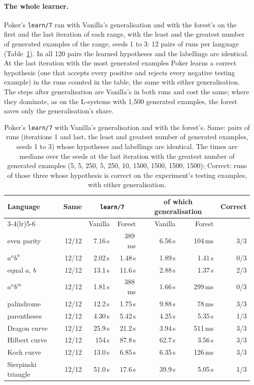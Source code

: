 \documentclass[11pt]{article}
\begin{document}
\paragraph{The whole learner.} Poker's \nolinkurl{learn/7} ran with Vanilla's
generalisation and with the forest's on the first and the last iteration of each
range, with the least and the greatest number of generated examples of the range,
seeds 1 to 3: 12 pairs of runs per language (Table~\ref{tab:aaai-learn}).
In all 120 pairs the learned hypotheses and the labellings are identical. At the
last iteration with the most generated examples Poker learns a correct hypothesis
(one that accepts every positive and rejects every negative testing example) in the
runs counted in the table, the same with either generalisation. The steps after
generalisation are Vanilla's in both runs and cost the same; where they dominate,
as on the L-systems with 1,500 generated examples, the forest saves only the
generalisation's share.

\begin{table}[ht]
\centering
\small
\begin{tabular}{lrrrrrr}
\toprule
Language & Same & \multicolumn{2}{c}{\nolinkurl{learn/7}} & \multicolumn{2}{c}{of which generalisation} & Correct\\
\cmidrule(lr){3-4}\cmidrule(lr){5-6}
 & & Vanilla & Forest & Vanilla & Forest & \\
\midrule
even parity      & 12/12 & 7.16\,s  & 389\,ms  & 6.56\,s  & 104\,ms  & 3/3\\
$a^nb^n$         & 12/12 & 2.02\,s  & 1.48\,s  & 1.89\,s  & 1.41\,s  & 0/3\\
equal $a$, $b$   & 12/12 & 13.1\,s  & 11.6\,s  & 2.88\,s  & 1.37\,s  & 2/3\\
$a^nb^m$         & 12/12 & 1.81\,s  & 388\,ms  & 1.66\,s  & 299\,ms  & 0/3\\
palindrome       & 12/12 & 12.2\,s  & 1.75\,s  & 9.88\,s  & 78\,ms   & 3/3\\
parentheses      & 12/12 & 4.30\,s  & 5.42\,s  & 4.25\,s  & 5.35\,s  & 1/3\\
\midrule
Dragon curve     & 12/12 & 25.9\,s  & 21.2\,s  & 3.94\,s  & 511\,ms  & 3/3\\
Hilbert curve    & 12/12 & 154\,s   & 87.8\,s  & 62.7\,s  & 3.56\,s  & 3/3\\
Koch curve       & 12/12 & 13.0\,s  & 6.85\,s  & 6.35\,s  & 126\,ms  & 3/3\\
Sierpinski triangle & 12/12 & 51.0\,s & 17.6\,s & 39.9\,s & 5.05\,s & 1/3\\
\bottomrule
\end{tabular}
\caption{Poker's \nolinkurl{learn/7} with Vanilla's generalisation and with the
forest's. Same: pairs of runs (iterations 1 and last, the least and greatest number
of generated examples, seeds 1 to 3) whose hypotheses and labellings are identical.
The times are medians over the seeds at the last iteration with the greatest number
of generated examples (5, 5, 250, 5, 250, 10, 1500, 1500, 1500, 1500); Correct:
runs of those three whose hypothesis is correct on the experiment's testing
examples, with either generalisation.}
\label{tab:aaai-learn}
\end{table}
\end{document}
